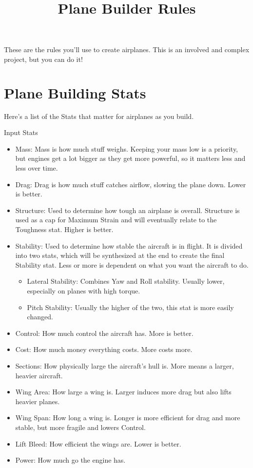 \documentclass{article}
\title{Plane Builder Rules}
\begin{document}
These are the rules you'll use to create airplanes. This is an involved
and complex project, but you can do it!

\section{Plane Building Stats}
\label{_Plane Building Stats}

Here's a list of the Stats that matter for airplanes as you build.

Input Stats

\begin{itemize}
  \item          Mass: Mass is how much stuff weighs. Keeping your mass low is a
        priority, but engines get a lot bigger as they get more powerful, so
        it matters less and less over time.
  \item          Drag: Drag is how much stuff catches airflow, slowing the plane
        down. Lower is better.
  \item          Structure: Used to determine how tough an airplane is overall.
        Structure is used as a cap for Maximum Strain and will eventually
        relate to the Toughness stat. Higher is better.
  \item          Stability: Used to determine how stable the aircraft is in
        flight. It is divided into two stats, which will be synthesized at the
        end to create the final Stability stat. Less or more is dependent on
        what you want the aircraft to do.

        \begin{itemize}
          \item                    Lateral Stability: Combines Yaw and Roll stability. Usually
                lower, especially on planes with high torque.
          \item                    Pitch Stability: Usually the higher of the two, this stat is
                more easily changed.
        \end{itemize}
\end{itemize}

\begin{itemize}
  \item          Control: How much control the aircraft has. More is better.
  \item          Cost: How much money everything costs. More costs more.
  \item          Sections: How physically large the aircraft's hull is. More
        means a larger, heavier aircraft.
  \item          Wing Area: How large a wing is. Larger induces more drag but
        also lifts heavier planes.
  \item          Wing Span: How long a wing is. Longer is more efficient for
        drag and more stable, but more fragile and lowers Control.
  \item          Lift Bleed: How efficient the wings are. Lower is better.
  \item          Power: How much go the engine has.
\end{itemize}
\end{document}
